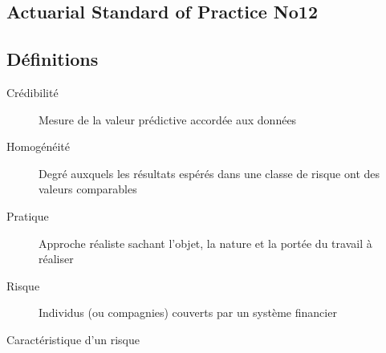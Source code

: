 \documentclass[10pt, french]{article}
\begin{document}
\begin{multicols*}{2}

\section{Actuarial Standard of Practice No12}
\subsection{Définitions}
\begin{description}
\item[Crédibilité] Mesure de la valeur prédictive accordée aux données
\item[Homogénéité] Degré auxquels les résultats espérés dans une classe de risque ont des valeurs comparables
\item[Pratique] Approche réaliste sachant l'objet, la nature et la portée du travail à réaliser
\item[Risque] Individus (ou compagnies) couverts par un système financier
\item[Caractéristique d'un risque]
\end{description}

\end{multicols*}
\end{document}
